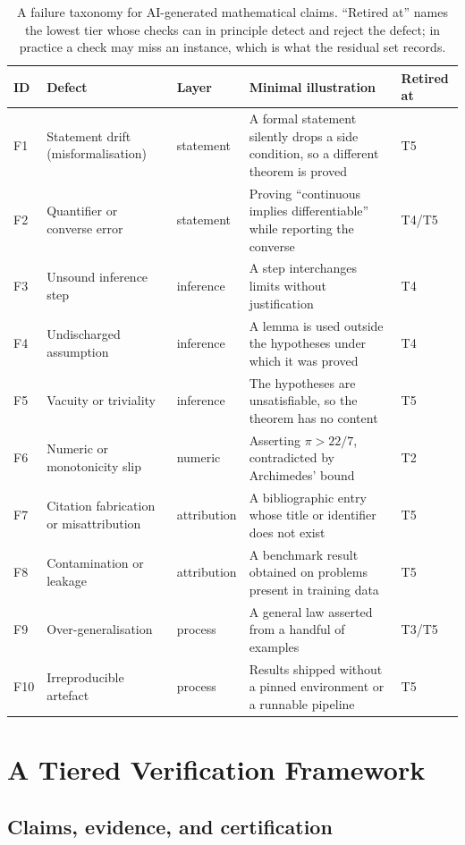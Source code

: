 \documentclass[11pt]{article}
\theoremstyle{plain}
\theoremstyle{definition}
\begin{document}
\begin{table}[t]
\centering
\small
\caption{A failure taxonomy for AI-generated mathematical claims. ``Retired at'' names the
lowest tier whose checks can in principle detect and reject the defect; in practice a check
may miss an instance, which is what the residual set records.}
\label{tab:taxonomy}
\begin{tabular}{@{}p{0.7cm}p{3.0cm}p{1.6cm}p{5.6cm}p{1.5cm}@{}}
\toprule
ID & Defect & Layer & Minimal illustration & Retired at \\
\midrule
F1 & Statement drift (misformalisation) & statement & A formal statement silently drops a
side condition, so a different theorem is proved & T5 \\
F2 & Quantifier or converse error & statement & Proving ``continuous implies
differentiable'' while reporting the converse & T4/T5 \\
F3 & Unsound inference step & inference & A step interchanges limits without justification
& T4 \\
F4 & Undischarged assumption & inference & A lemma is used outside the hypotheses under
which it was proved & T4 \\
F5 & Vacuity or triviality & inference & The hypotheses are unsatisfiable, so the theorem
has no content & T5 \\
F6 & Numeric or monotonicity slip & numeric & Asserting $\pi>22/7$, contradicted by
Archimedes' bound & T2 \\
F7 & Citation fabrication or misattribution & attribution & A bibliographic entry whose
title or identifier does not exist & T5 \\
F8 & Contamination or leakage & attribution & A benchmark result obtained on problems
present in training data & T5 \\
F9 & Over-generalisation & process & A general law asserted from a handful of examples
& T3/T5 \\
F10 & Irreproducible artefact & process & Results shipped without a pinned environment or a
runnable pipeline & T5 \\
\bottomrule
\end{tabular}
\end{table}
\section{A Tiered Verification Framework}
\label{sec:framework}

\subsection{Claims, evidence, and certification}
\end{document}
